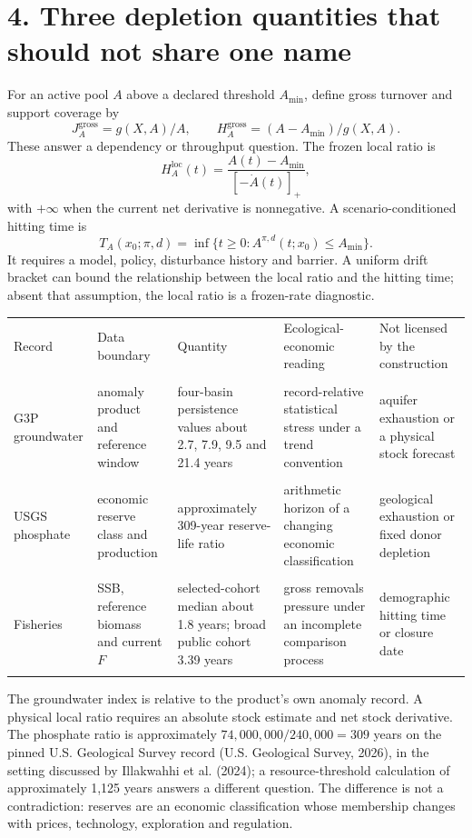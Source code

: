\documentclass[11pt]{article}
\begin{document}
\section{4. Three depletion quantities that should not share one name}
For an active pool \(A\) above a declared threshold \(A_{\min}\), define gross turnover and support coverage by
\[J_A^{\mathrm{gross}}=g(X,A)/A,\qquad H_A^{\mathrm{gross}}=(A-A_{\min})/g(X,A).\]
These answer a dependency or throughput question. The frozen local ratio is
\[H_A^{\mathrm{loc}}(t)=\frac{A(t)-A_{\min}}{[-\dot A(t)]_+},\]
with \(+\infty\) when the current net derivative is nonnegative. A scenario-conditioned hitting time is
\[T_A(x_0;\pi,d)=\inf\{t\ge0:A^{\pi,d}(t;x_0)\le A_{\min}\}.\]
It requires a model, policy, disturbance history and barrier. A uniform drift bracket can bound the relationship between the local ratio and the hitting time; absent that assumption, the local ratio is a frozen-rate diagnostic.
\begin{tabularx}{\linewidth}{XXXXX}
\toprule
Record & Data boundary & Quantity & Ecological-economic reading & Not licensed by the construction \\\\
\midrule
G3P groundwater & anomaly product and reference window & four-basin persistence values about 2.7, 7.9, 9.5 and 21.4 years & record-relative statistical stress under a trend convention & aquifer exhaustion or a physical stock forecast \\\\
USGS phosphate & economic reserve class and production & approximately 309-year reserve-life ratio & arithmetic horizon of a changing economic classification & geological exhaustion or fixed donor depletion \\\\
Fisheries & SSB, reference biomass and current \(F\) & selected-cohort median about 1.8 years; broad public cohort 3.39 years & gross removals pressure under an incomplete comparison process & demographic hitting time or closure date \\\\
\bottomrule
\end{tabularx}
\medskip
The groundwater index is relative to the product's own anomaly record. A physical local ratio requires an absolute stock estimate and net stock derivative. The phosphate ratio is approximately \(74{,}000{,}000/240{,}000=309\) years on the pinned U.S. Geological Survey record (U.S. Geological Survey, 2026), in the setting discussed by Illakwahhi et al. (2024); a resource-threshold calculation of approximately 1,125 years answers a different question. The difference is not a contradiction: reserves are an economic classification whose membership changes with prices, technology, exploration and regulation.
\end{document}
